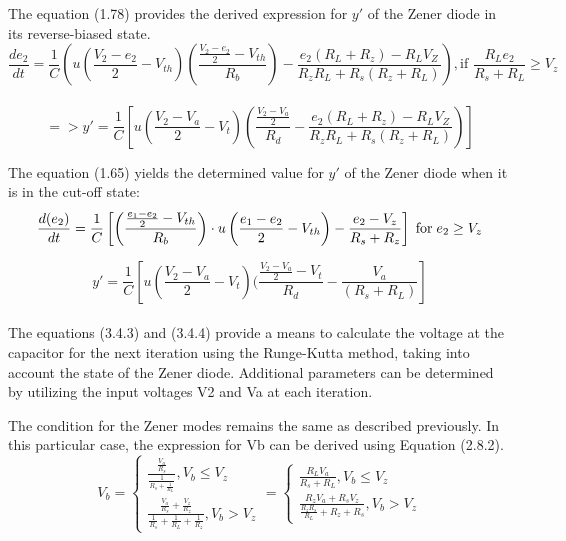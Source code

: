 The equation (1.78) provides the derived expression for $y'$ of the Zener diode in its reverse-biased state.\\

\begin{equation}
    \frac{de_2}{dt}=\frac{1}{C}\left(u\left(\frac{V_2-e_2}{2}-V_{th}\right)\left(\frac{\frac{V_2-e_2}{2}-V_{th}}{R_b}\right)-\frac{e_2(R_L+R_z)-R_LV_Z}{R_zR_L+R_s(R_z+R_L)}\right), \text{if } \frac{R_Le_2}{R_s+R_L} \geq V_z
\end{equation}\\

\begin{equation}
    =>y'=\frac{1}{C}[u(\frac{V_2-V_a}{2}-V_t)(\frac{\frac{V_2-V_a}{2}}{R_d}-\frac{e_2(R_L+R_z)-R_LV_Z}{R_zR_L+R_s(R_z+R_L)})]
\end{equation}

The equation (1.65) yields the determined value for $y'$ of the Zener diode when it is in the cut-off state:\\

\begin{equation}
    \frac{d(e_2)}{dt}=\frac{1}{C}\left[\left(\frac{\frac{e_1 - e_2}{2} - V_{th}}{R_b} \right)\cdot u\left(\frac{e_1 - e_2}{2} - V_{th} \right)-\frac{e_2-V_z}{R_s+R_z} \right] \hspace{0.1cm} \text{for} \hspace{0.1cm} e_2 \geq V_z
\end{equation}

\begin{equation}
    y'=\frac{1}{C}[u(\frac{V_2-V_a}{2}-V_t)(\frac{\frac{V_2-V_a}{2}-V_t}{R_d}-\frac{V_a}{(R_s+R_L)}]
\end{equation}\\

The equations (3.4.3) and (3.4.4) provide a means to calculate the voltage at the capacitor for the next iteration using the Runge-Kutta method, taking into account the state of the Zener diode. Additional parameters can be determined by utilizing the input voltages V2 and Va at each iteration.

The condition for the Zener modes remains the same as described previously. In this particular case, the expression for Vb can be derived using Equation (2.8.2).\\

\begin{equation}
    V_b=\begin{cases}
        \frac{\frac{V_a}{R_s}}{\frac{1}{R_s+\frac{1}{R_L}}}, V_b \leq V_z\\
        \frac{\frac{V_a}{R_s}+\frac{V_z}{R_z}}{\frac{1}{R_s}+\frac{1}{R_L}+\frac{1}{R_z}}, V_b>V_z
    \end{cases}=\begin{cases}
        \frac{R_LV_a}{R_s+R_L}, V_b \leq V_z\\
        \frac{R_zV_a+R_sV_z}{\frac{R_zR_s}{R_L}+R_z+R_s}, V_b>V_z
    \end{cases}
\end{equation}\\


